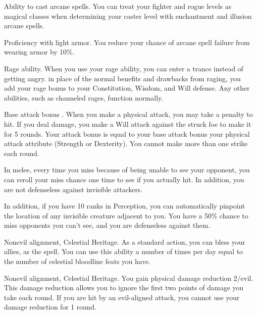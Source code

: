 \featpre Ability to cast arcane spells.
\featben You can treat your fighter and rogue levels as magical classes when determining your caster level with enchantment and illusion arcane spells.

\featpre Proficiency with light armor.
\featben You reduce your chance of arcane spell failure from wearing armor by 10\%.

\featpre Rage ability.
\featben When you use your rage ability, you can enter a trance instead of getting angry. in place of the normal benefits and drawbacks from raging, you add your rage bonus to your Constitution, Wisdom, and Will defense. Any other abilities, such as channeled rages, function normally.

\featpre Base attack bonus .
\featben When you make a physical attack, you may take a  penalty to hit. If you deal damage, you make a Will attack against the struck foe to make it \bewildered for 5 rounds. Your attack bonus is equal to your base attack bonus \add your physical attack attribute (Strength or Dexterity). You cannot make more than one strike each round.

 In melee, every time you miss because of being unable to see your opponent, you can reroll your miss chance one time to see if you actually hit. In addition, you are not defenseless against invisible attackers.
\par In addition, if you have 10 ranks in Perception, you can automatically pinpoint the location of any invisible creature adjacent to you.
 You have a 50\% chance to miss opponents you can't see, and you are defenseless against them.

 Nonevil alignment, Celestial Heritage.
 As a standard action, you can bless your allies, as the  spell. You can use this ability a number of times per day equal to the number of celestial bloodline feats you have.

 Nonevil alignment, Celestial Heritage.
 You gain physical damage reduction 2/evil. This damage reduction allows you to ignore the first two points of damage you take each round. If you are hit by an evil-aligned attack, you cannot use your damage reduction for 1 round.


